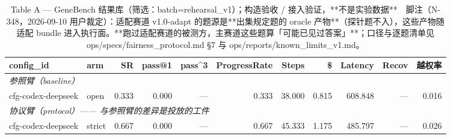 \begin{table}[t]
\centering
\caption{Table A — GeneBench 结果库（筛选：batch=rehearsal\_v1）；构造验收 / 接入验证，**不是实验数据**　脚注（N-348，2026-09-10 用户裁定）：适配赛道 v1.0-adapt 的题源是**出集规定题的 oracle 产物**（探针题不入），这些产物随适配 bundle 进入执行面。**跑过适配赛道的被测方，主赛道这些题算「可能已见过答案」**；口径与逐题清单见 ops/specs/fairness\_protocol.md §7 与 ops/reports/known\_limits\_v1.md。}
\label{tab:a-rehearsal_v1}
\begin{tabular}{llrrrrrrrrr}
\toprule
config\_id & arm & SR & pass@1 & pass\^{}3 & ProgressRate & Steps & \$ & Latency & Recov & 越权率 \\
\midrule
\multicolumn{11}{l}{\textit{参照臂（baseline）}} \\
cfg-codex-deepseek & open & 0.333 & 0.000 & --- & 0.333 & 38.000 & 0.815 & 608.848 & --- & 0.016 \\
\midrule
\multicolumn{11}{l}{\textit{协议臂（protocol）—— 与参照臂的差异是投放的工件}} \\
cfg-codex-deepseek & strict & 0.667 & 0.000 & --- & 0.667 & 45.333 & 1.175 & 485.797 & --- & 0.026 \\
\bottomrule
\end{tabular}
\end{table}

